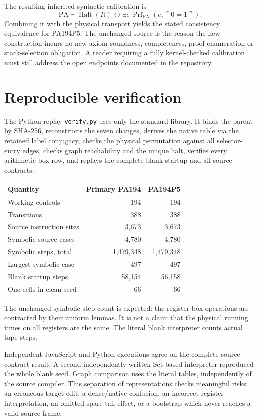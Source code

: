 \documentclass[11pt,letterpaper]{article}
\newcommand{\PA}{\mathrm{PA}}
\newcommand{\Halt}{\operatorname{Halt}}
\newcommand{\Prf}{\operatorname{Prf}}
\newcommand{\file}[1]{\texttt{\nolinkurl{#1}}}
\begin{document}
The resulting inherited syntactic calibration is
\[
 \PA\vdash
 \Halt(R)\leftrightarrow
 \exists e\,\Prf_{\PA}(e,\ulcorner0=1\urcorner).
\]
Combining it with the physical transport yields the stated
consistency equivalence for PA194P5. The unchanged source is
the reason the new construction incurs no new axiom-soundness,
completeness, proof-enumeration or stack-selection obligation.
A reader requiring a fully kernel-checked calibration must
still address the open endpoints documented in the repository.

\section{Reproducible verification}

The Python replay \file{verify.py} uses only the standard library.
It binds the parent by SHA-256, reconstructs the seven changes,
derives the native table via the retained label conjugacy, checks
the physical permutation against all selector-entry edges,
checks graph reachability and the unique halt, verifies every
arithmetic-box row, and replays the complete blank startup and
all source contracts.

\begin{center}
\begin{tabular}{@{}lrr@{}}
\toprule Quantity & Primary PA194 & PA194P5\\\midrule
Working controls &194&194\\
Transitions &388&388\\
Source instruction sites &3,673&3,673\\
Symbolic source cases &4,780&4,780\\
Symbolic steps, total &1,479,348&1,479,348\\
Largest symbolic case &497&497\\
Blank startup steps &58,154&56,158\\
One-cells in clean seed &66&66\\
\bottomrule
\end{tabular}
\end{center}

The unchanged symbolic step count is expected: the register-box
operations are contracted by their uniform lemmas. It is not a
claim that the physical running times on all registers are the
same. The literal blank interpreter counts actual tape steps.

Independent JavaScript and Python executions agree on the complete
source-contract result. A second independently written Set-based
interpreter reproduced the whole blank seed. Graph comparison
uses the literal tables, independently of the source compiler.
This separation of representations checks meaningful risks:
an erroneous target edit, a dense/native confusion, an incorrect
register interpretation, an omitted spare-tail effect, or a
bootstrap which never reaches a valid source frame.
\end{document}
